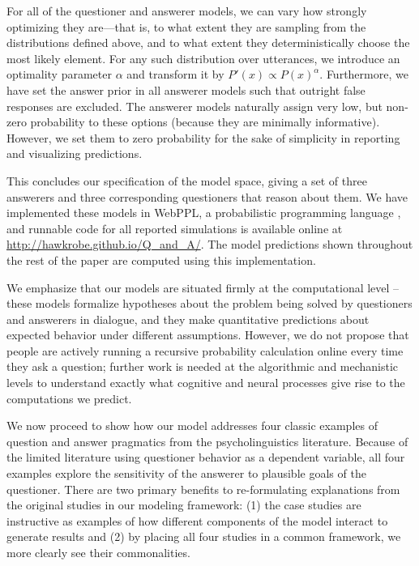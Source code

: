 \documentclass[12pt, floatsintext, jou]{apa6}
\begin{document}
For all of the questioner and answerer models, we can vary how strongly optimizing they are---that is, to what extent they are sampling from the distributions defined above, and to what extent they deterministically choose the most likely element. For any such distribution over utterances, we introduce an optimality parameter $\alpha$ and transform it by $ P'(x) \propto P(x)^{\alpha} $. Furthermore, we have set the answer prior in all answerer models such that outright false responses are excluded. The answerer models naturally assign very low, but non-zero probability to these options (because they are minimally informative). However, we set them to zero probability for the sake of simplicity in reporting and visualizing predictions.
%

This concludes our specification of the model space, giving a set of three answerers and three corresponding questioners that reason about them. We have implemented these models in WebPPL, a probabilistic programming language \cite{GoodmanStuhlmuller14_DIPPL}, and runnable code for all reported simulations is available online at \url{http://hawkrobe.github.io/Q\_and\_A/}. The model predictions shown throughout the rest of the paper are computed using this implementation. 

We emphasize that our models are situated firmly at the computational level \cite{Marr10_Vision} -- these models formalize hypotheses about the problem being solved by questioners and answerers in dialogue, and they make quantitative predictions about expected behavior under different assumptions. However, we do not propose that people are actively running a recursive probability calculation online every time they ask a question; further work is needed at the algorithmic and mechanistic levels to understand exactly what cognitive and neural processes give rise to the computations we predict. 

We now proceed to show how our model addresses four classic examples of question and answer pragmatics from the psycholinguistics literature. Because of the limited literature using questioner behavior as a dependent variable, all four examples explore the sensitivity of the answerer to plausible goals of the questioner. There are two primary benefits to re-formulating explanations from the original studies in our modeling framework: (1) the case studies are instructive as examples of how different components of the model interact to generate results and (2) by placing all four studies in a common framework, we more clearly see their commonalities. 
\end{document}
